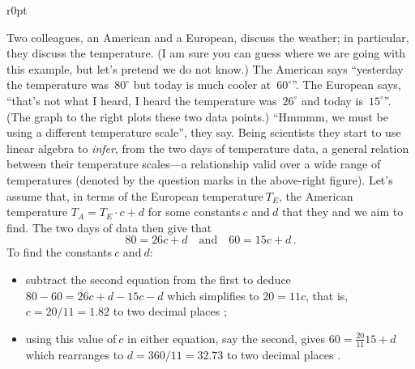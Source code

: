 \begin{wrapfigure}[8]r{0pt}
\end{wrapfigure}
\begin{example} \label{eg:infertemp}
Two colleagues, an American and a European, discuss the weather; in particular, they discuss the temperature.
(I am sure you can guess where we are going with this example, but let's pretend we do not know.)
The American says ``yesterday the temperature was~\(80^\circ\) but today is much cooler at~\(60^\circ\)''.
The European says, ``that's not what I heard, I heard the temperature was~\(26^\circ\) and today is~\(15^\circ\)''.
(The graph to the right plots these two data points.)
``Hmmmm, we must be using a different temperature scale'', they say.
Being scientists they start to use linear algebra to \emph{infer}, from the two days of temperature data, a general relation between their temperature scales---a relationship valid over a wide range of temperatures (denoted by the question marks in the above-right figure).
Let's assume that, in terms of the European temperature\(~T_E\), the American temperature \(T_A=T_E\cdot c+d\) for some constants\(~c\) and\(~d\) that they and we aim to find.
The two days of data then give that
\begin{equation*}
80=26c+d\quad\text{and}\quad 60=15c+d\,.
\end{equation*}
To find the constants\(~c\) and\(~d\):
\begin{itemize}
\item subtract the second equation from the first to deduce \(80-60=26c+d-15c-d\) which simplifies to \(20=11c\), that is, \(c=20/11=1.82\) to two decimal places \twodp;
\item using this value of\(~c\) in either equation, say the second, gives \(60=\frac{20}{11}15+d\) which rearranges to \(d=360/11=32.73\)  to two decimal places \twodp.
\end{itemize}


\end{example}
